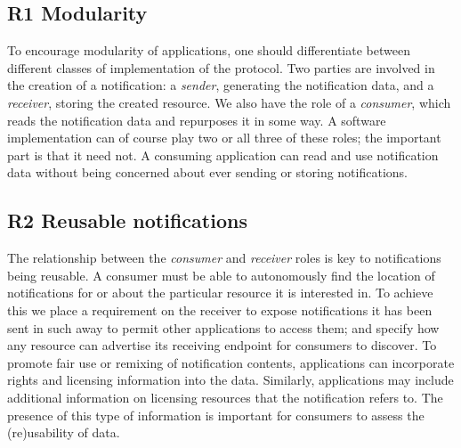                            
                                \subsection{R1 Modularity}
  \label{modularity}

                                
                                    
\par To encourage modularity of applications, one should differentiate between different classes of implementation of the protocol. Two parties are involved in the creation of a notification: a {\em sender}, generating the notification data, and a {\em receiver}, storing the created resource. We also have the role of a {\em consumer}, which reads the notification data and repurposes it in some way. A software implementation can of course play two or all three of these roles; the important part is that it need not. A consuming application can read and use notification data without being concerned about ever sending or storing notifications.
                                
                            

                            
                                \subsection{R2 Reusable notifications}
  \label{reusable-notifications}

                                
                                    
\par The relationship between the {\em consumer} and {\em receiver} roles is key to notifications being reusable. A consumer must be able to autonomously find the location of notifications for or about the particular resource it is interested in. To achieve this we place a requirement on the receiver to expose notifications it has been sent in such away to permit other applications to access them; and specify how any resource can advertise its receiving endpoint for consumers to discover. To promote fair use or remixing of notification contents, applications can incorporate rights and licensing information into the data. Similarly, applications may include additional information on licensing resources that the notification refers to. The presence of this type of information is important for consumers to assess the (re)usability of data.
                                
